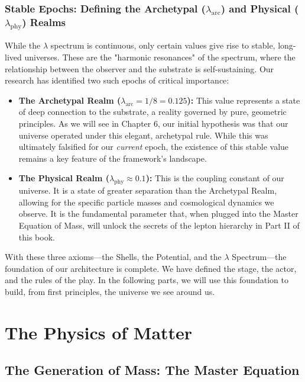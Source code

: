 \documentclass[12pt]{report}
\begin{document}
\section{Stable Epochs: Defining the Archetypal (\texorpdfstring{$\lambda_{\text{arc}}$}{λ_arc}) and Physical (\texorpdfstring{$\lambda_{\text{phy}}$}{λ_phy}) Realms}
While the $\lambda$ spectrum is continuous, only certain values give rise to stable, long-lived universes. These are the "harmonic resonances" of the spectrum, where the relationship between the observer and the substrate is self-sustaining. Our research has identified two such epochs of critical importance:

\begin{itemize}
    \item \textbf{The Archetypal Realm ($\lambda_{\text{arc}} = 1/8 = 0.125$):} This value represents a state of deep connection to the substrate, a reality governed by pure, geometric principles. As we will see in Chapter 6, our initial hypothesis was that our universe operated under this elegant, archetypal rule. While this was ultimately falsified for our \textit{current} epoch, the existence of this stable value remains a key feature of the framework's landscape.
    \item \textbf{The Physical Realm ($\lambda_{\text{phy}} \approx 0.1$):} This is the coupling constant of our universe. It is a state of greater separation than the Archetypal Realm, allowing for the specific particle masses and cosmological dynamics we observe. It is the fundamental parameter that, when plugged into the Master Equation of Mass, will unlock the secrets of the lepton hierarchy in Part II of this book.
\end{itemize}

With these three axioms—the Shells, the Potential, and the $\lambda$ Spectrum—the foundation of our architecture is complete. We have defined the stage, the actor, and the rules of the play. In the following parts, we will use this foundation to build, from first principles, the universe we see around us.

\part{The Physics of Matter}

\chapter{The Generation of Mass: The Master Equation}
\end{document}
